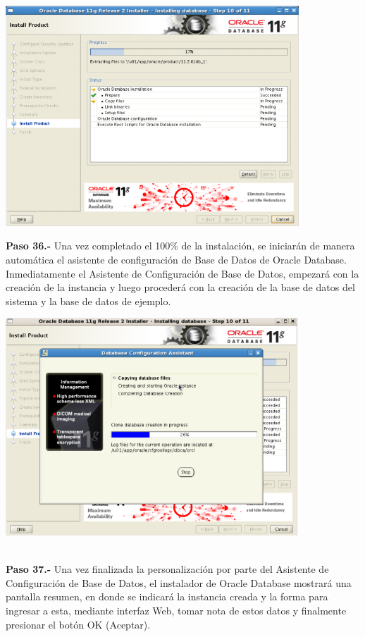 \begin{enumerate}
\begin{center}
  \includegraphics[width=11cm]{Imagenes/Oracle_Database/Paso_35.png}
\end{center}
\break

\textbf {Paso 36.-} Una vez completado el 100\% de la instalación, se iniciarán de manera automática el asistente de configuración  de Base de Datos de Oracle Database. Inmediatamente el Asistente de Configuración de Base de Datos, empezará con la creación de la instancia y luego procederá con la creación de la base de datos del sistema y la base de datos de ejemplo.

\begin{center}
  \includegraphics[width=11cm]{Imagenes/Oracle_Database/Paso_36.png}
\end{center}
\vspace{12pt}\\

\textbf {Paso 37.-} Una vez finalizada la personalización por parte del Asistente de Configuración de Base de Datos, el instalador de Oracle Database mostrará una pantalla resumen, en donde se indicará la instancia creada y la forma para ingresar a esta, mediante interfaz Web, tomar nota de estos datos y finalmente presionar el botón OK (Aceptar).


\end{enumerate}
